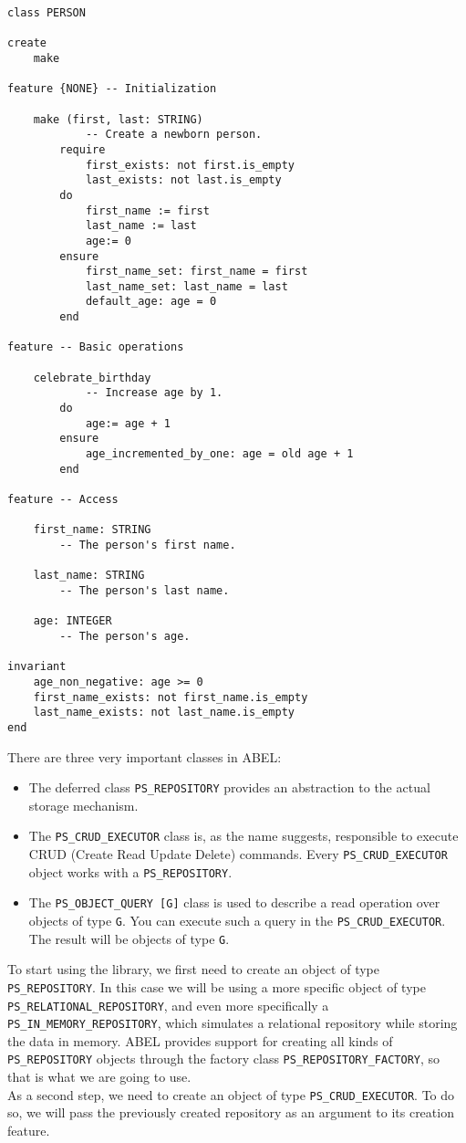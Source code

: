 \documentclass[a4paper,12pt]{report}
\begin{document}
\begin{lstlisting}[language=OOSC2Eiffel, captionpos=b, caption={The PERSON class}, label={lst:person_class}]
class PERSON

create
	make

feature {NONE} -- Initialization

	make (first, last: STRING)
			-- Create a newborn person.
		require
			first_exists: not first.is_empty
			last_exists: not last.is_empty
		do
			first_name := first
			last_name := last
			age:= 0
		ensure
			first_name_set: first_name = first
			last_name_set: last_name = last
			default_age: age = 0
		end

feature -- Basic operations

	celebrate_birthday
			-- Increase age by 1.
		do
			age:= age + 1
		ensure
			age_incremented_by_one: age = old age + 1
		end

feature -- Access

	first_name: STRING
		-- The person's first name.

	last_name: STRING
		-- The person's last name.

	age: INTEGER
		-- The person's age.

invariant
	age_non_negative: age >= 0
	first_name_exists: not first_name.is_empty
	last_name_exists: not last_name.is_empty
end

\end{lstlisting}

There are three very important classes in ABEL:
\begin{itemize}
 \item The deferred class \lstinline!PS_REPOSITORY! provides an abstraction to the actual storage mechanism.
 \item The \lstinline!PS_CRUD_EXECUTOR! class is, as the name suggests, responsible to execute CRUD (Create Read Update Delete) commands. Every \lstinline!PS_CRUD_EXECUTOR! object works with a \lstinline!PS_REPOSITORY!.

 \item The \lstinline!PS_OBJECT_QUERY [G]! class is used to describe a read operation over objects of type \lstinline!G!. You can execute such a query in the \lstinline!PS_CRUD_EXECUTOR!. 
	The result will be objects of type \lstinline!G!.

 
\end{itemize}
To start using the library, we first need to create an object of type\\
\lstinline!PS_REPOSITORY!. In this case we will be using a more specific object of type \lstinline{PS_RELATIONAL_REPOSITORY}, and even more specifically a  \lstinline!PS_IN_MEMORY_REPOSITORY!, which simulates a relational repository while storing the data in memory. ABEL provides support for creating all kinds of \lstinline!PS_REPOSITORY! objects through the factory class \lstinline!PS_REPOSITORY_FACTORY!, so that is what we are going to use.\\
As a second step, we need to create an object of type  \lstinline{PS_CRUD_EXECUTOR}. To do so, we will pass the previously created repository as an argument to its creation feature.
\end{document}
